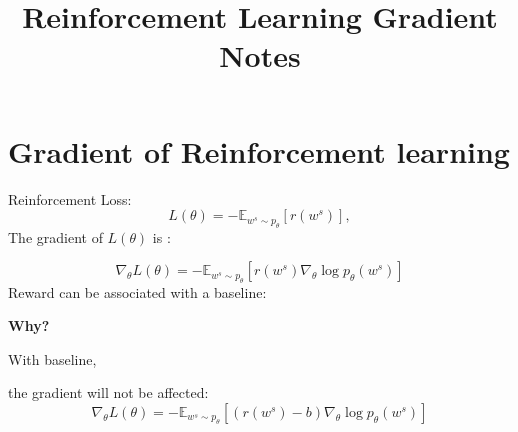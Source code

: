 \documentclass[10pt,twocolumn]{article}
\begin{document}
\title{Reinforcement Learning Gradient Notes}


\maketitle



\section{Gradient of Reinforcement learning}

Reinforcement Loss:
\begin{equation}
L(\theta) = -\mathbb{E}_{w^{s} \sim p_{\theta}}[r(w^{s})],
\end{equation}
The gradient of $L(\theta)$ is :


\begin{equation}
\nabla_{\theta} L(\theta)  =  - \mathbb{E}_{w^{s} \sim p_{\theta}} [r(w^{s}) \nabla_{\theta} \log p_{\theta}(w^{s}) ]
\end{equation}
Reward can be associated with a baseline:

\textbf{Why?}


With baseline,

the gradient will not be affected:
\begin{equation}
\nabla_{\theta} L(\theta)  =  - \mathbb{E}_{w^{s} \sim p_{\theta}} [(r(w^{s})-b) \nabla_{\theta} \log p_{\theta}(w^{s}) ]
\end{equation}











{\small


}
\end{document}
